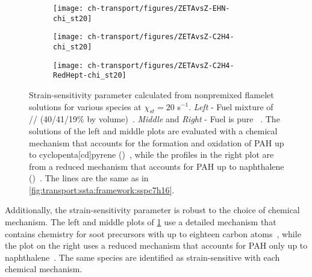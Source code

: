 \begin{figure}[ht]
  \centering
  \begin{subfigure}[b]{0.33\linewidth}
    \texttt{[image: ch-transport/figures/ZETAvsZ-EHN-chi\_st20]}
  \end{subfigure}%
  \begin{subfigure}[b]{0.33\linewidth}
    \texttt{[image: ch-transport/figures/ZETAvsZ-C2H4-chi\_st20]}
  \end{subfigure}%
  \begin{subfigure}[b]{0.33\linewidth}
    \texttt{[image: ch-transport/figures/ZETAvsZ-C2H4-RedHept-chi\_st20]}
  \end{subfigure}
  \caption[Dependencies of Strain-Sensitivity Parameter $\zeta_k$ on Fuel Mixture and Chemical Mechanism]{Strain-sensitivity parameter calculated from nonpremixed flamelet solutions for various species at $\chi_{st} = 20$ s$^{-1}$. \textit{Left} - Fuel mixture of // (40/41/19\% by volume)~\cite{mahmoud2017}. \textit{Middle} and \textit{Right} - Fuel is pure ~\cite{shaddix2010,zhang2011}. The solutions of the left and middle plots are evaluated with a chemical mechanism that accounts for the formation and oxidation of PAH up to cyclopenta[cd]pyrene ()~\cite{blanquart2009588,narayanaswamy2010}, while the profiles in the right plot are from a reduced mechanism that accounts for PAH up to naphthalene ()~\cite{bisetti2012}. The lines are the same as in \cref{fig:transport:ssta:framework:sspc7h16}.} %
  \label{fig:transport:ssta:dependencies:fuelchem}
\end{figure}

Additionally, the strain-sensitivity parameter is robust to the choice of chemical mechanism. The left and middle plots of \cref{fig:transport:ssta:dependencies:fuelchem} use a detailed mechanism that contains chemistry for soot precursors with up to eighteen carbon atoms~\cite{blanquart2009588,narayanaswamy2010}, while the plot on the right uses a reduced mechanism that accounts for PAH only up to naphthalene~\cite{bisetti2012}. The same species are identified as strain-sensitive with each chemical mechanism. 


